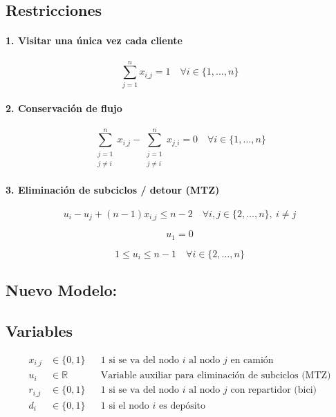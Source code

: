 \documentclass{article}
\begin{document}
\subsection*{Restricciones}

\paragraph{1. Visitar una única vez cada cliente}
\[
\sum_{j=1}^{n} x_{i\_j} = 1 \quad \forall i \in \{1, \dots, n\}
\]

\paragraph{2. Conservación de flujo}
\[
\sum_{\substack{j=1 \\ j \ne i}}^{n} x_{i\_j} - \sum_{\substack{j=1 \\ j \ne i}}^{n} x_{j\_i} = 0 \quad \forall i \in \{1, \dots, n\}
\]

\paragraph{3. Eliminación de subciclos / detour (MTZ)}
\[
u_i - u_j + (n - 1)x_{i\_j} \leq n - 2 \quad \forall i, j \in \{2, \dots, n\},\ i \ne j
\]

\[
u_1 = 0
\]

\[
1 \leq u_i \leq n - 1 \quad \forall i \in \{2, \dots, n\}
\]

\subsection{Nuevo Modelo:} \label{model_repartidores}
\subsection*{Variables}
\begin{align*}
    x_{i\_j} &\in \{0,1\} && \text{1 si se va del nodo } i \text{ al nodo } j \text{ en camión }\\
    u_i &\in \mathbb{R} && \text{Variable auxiliar para eliminación de subciclos (MTZ)} \\
    r_{i\_j} &\in \{0,1\} && \text{1 si se va del nodo } i \text{ al nodo } j \text{ con repartidor (bici) } \\
    d_{i} &\in \{0,1\} && \text{1 si el nodo $i$ es depósito } 
\end{align*}
\end{document}
